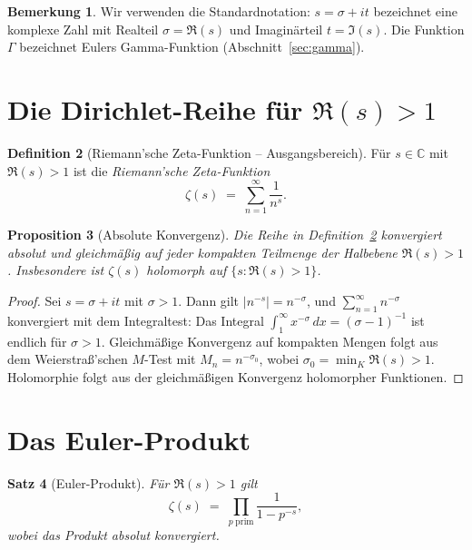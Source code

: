 \documentclass[12pt,a4paper]{amsart}
\newtheorem{theorem}{Satz}[section]
\newtheorem{proposition}[theorem]{Proposition}
\theoremstyle{definition}
\newtheorem{definition}[theorem]{Definition}
\newtheorem{remark}[theorem]{Bemerkung}
\newcommand{\C}{\mathbb{C}}
\begin{document}
\begin{remark}
Wir verwenden die Standardnotation: $s = \sigma + it$ bezeichnet eine
komplexe Zahl mit Realteil $\sigma = \Re(s)$ und Imagin\"arteil $t = \Im(s)$.
Die Funktion $\Gamma$ bezeichnet Eulers Gamma-Funktion
(Abschnitt~\ref{sec:gamma}).
\end{remark}

\section{Die Dirichlet-Reihe f\"ur \texorpdfstring{$\Re(s)>1$}{Re(s)>1}}

\begin{definition}[Riemann'sche Zeta-Funktion -- Ausgangsbereich]
\label{def:zeta_series}
F\"ur $s \in \C$ mit $\Re(s) > 1$ ist die \emph{Riemann'sche Zeta-Funktion}
\[
  \zeta(s) \;=\; \sum_{n=1}^{\infty} \frac{1}{n^s}.
\]
\end{definition}

\begin{proposition}[Absolute Konvergenz]
\label{prop:convergence}
Die Reihe in Definition~\ref{def:zeta_series} konvergiert absolut und
gleichm\"a\ss ig auf jeder kompakten Teilmenge der Halbebene $\Re(s) > 1$.
Insbesondere ist $\zeta(s)$ holomorph auf $\{s : \Re(s) > 1\}$.
\end{proposition}

\begin{proof}
Sei $s = \sigma + it$ mit $\sigma > 1$. Dann gilt $|n^{-s}| = n^{-\sigma}$,
und $\sum_{n=1}^\infty n^{-\sigma}$ konvergiert mit dem Integraltest:
Das Integral $\int_1^\infty x^{-\sigma}\,dx = (\sigma-1)^{-1}$ ist endlich
f\"ur $\sigma > 1$.
Gleichm\"a\ss ige Konvergenz auf kompakten Mengen folgt aus dem
Weierstra\ss'schen $M$-Test mit $M_n = n^{-\sigma_0}$, wobei
$\sigma_0 = \min_K \Re(s) > 1$.
Holomorphie folgt aus der gleichm\"a\ss igen Konvergenz
holomorpher Funktionen.
\end{proof}

\section{Das Euler-Produkt}

\begin{theorem}[Euler-Produkt]
\label{thm:euler_product}
F\"ur $\Re(s) > 1$ gilt
\[
  \zeta(s) \;=\; \prod_{p\;\text{prim}} \frac{1}{1 - p^{-s}},
\]
wobei das Produkt absolut konvergiert.
\end{theorem}
\end{document}

